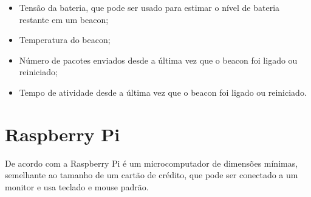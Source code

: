 \begin{itemize}
	\item Tensão da bateria, que pode ser usado para estimar o nível de bateria restante em um beacon;
	\item Temperatura do beacon;
	\item Número de pacotes enviados desde a última vez que o beacon foi ligado ou reiniciado;
	\item Tempo de atividade desde a última vez que o beacon foi ligado ou reiniciado.
\end{itemize}

\section{Raspberry Pi}
\label{sec:raspberrypi}

De acordo com a \cite{RPiFoundation} Raspberry Pi é um microcomputador de dimensões mínimas, semelhante ao tamanho de um cartão de crédito, que pode ser conectado a um monitor e usa teclado e mouse padrão. \\

\begin{figure}[h!]
	\centering
\end{figure}

